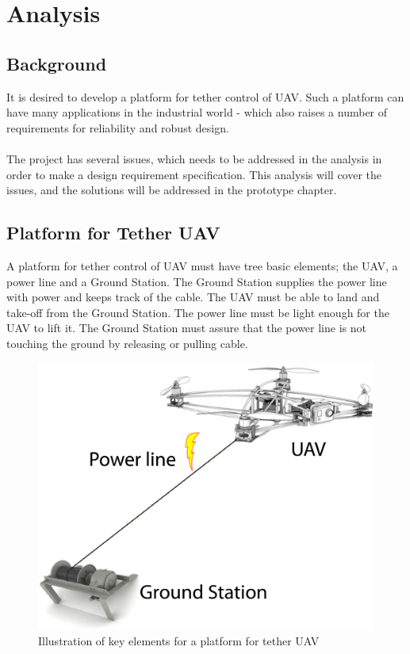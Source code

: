 
\chapter{Analysis}

\section{Background}
It is desired to develop a platform for tether control of UAV. Such a platform can have many applications in the industrial world - which also raises a number of requirements for reliability and robust design. \\
\\
The project has several issues, which needs to be addressed in the analysis in order to make a design requirement specification. This analysis will cover the issues, and the solutions will be addressed in the prototype chapter.



\section{Platform for Tether UAV}
A platform for tether control of UAV must have tree basic elements; the UAV, a power line and a Ground Station. The Ground Station supplies the power line with power and keeps track of the cable. The UAV must be able to land and take-off from the Ground Station. The power line must be light enough for the UAV to lift it. The Ground Station must assure that the power line is not touching the ground by releasing or pulling cable.

\begin{figure}[hbtp]
\centering
\includegraphics[scale=0.5]{graphics/overall-system.png}
\caption{Illustration of key elements for a platform for tether UAV}
\end{figure}

